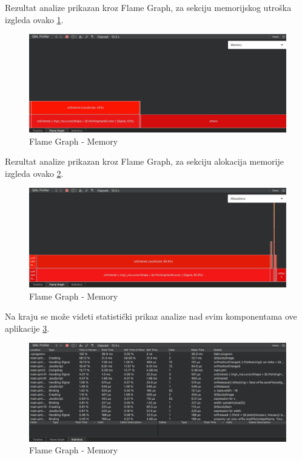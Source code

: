 \documentclass[a4paper]{article}
\begin{document}
Rezultat analize prikazan kroz Flame Graph, za sekciju memorijskog utroška izgleda ovako \ref{fig: qml-06}.

\begin{figure}[h!]
\begin{center}
\includegraphics[scale=0.30]{qml-prof-06.png}
\end{center}
\caption{Flame Graph - Memory}
\label{fig: qml-06}
\end{figure}

Rezultat analize prikazan kroz Flame Graph, za sekciju alokacija memorije izgleda ovako \ref{fig: qml-07}.

\begin{figure}[h!]
\begin{center}
\includegraphics[scale=0.30]{qml-prof-07.png}
\end{center}
\caption{Flame Graph - Memory}
\label{fig: qml-07}
\end{figure}

Na kraju se može videti statistički prikaz analize nad svim komponentama ove aplikacije \ref{fig: qml-08}.

\begin{figure}[h!]
\begin{center}
\includegraphics[scale=0.30]{qml-prof-08.png}
\end{center}
\caption{Flame Graph - Memory}
\label{fig: qml-08}
\end{figure}
\end{document}
